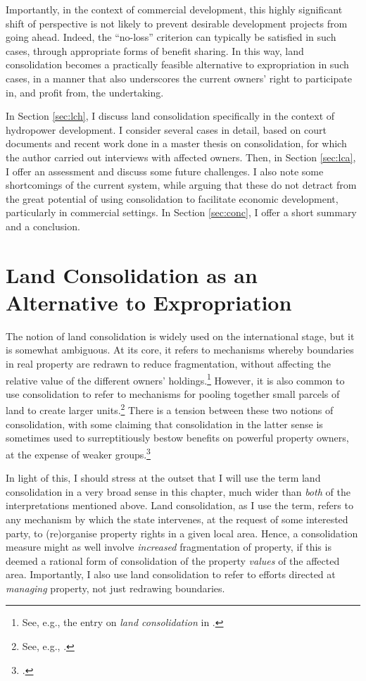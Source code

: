 Importantly, in the context of commercial development, this highly significant shift of perspective is not likely to prevent  desirable development projects from going ahead. Indeed, the ``no-loss'' criterion can typically be satisfied in such cases, through appropriate forms of benefit sharing. In this way, land consolidation becomes a practically feasible alternative to expropriation in such cases, in a manner that also underscores the current owners' right to participate in, and profit from, the undertaking.

In Section \ref{sec:lch}, I discuss land consolidation specifically in the context of hydropower development. I consider several cases in detail, based on court documents and recent work done in a master thesis on consolidation, for which the author carried out interviews with affected owners. Then, in Section \ref{sec:lca}, I offer an assessment and discuss some future challenges. I also note some shortcomings of the current system, while arguing that these do not detract from the great potential of using consolidation to facilitate economic development, particularly in commercial settings. In Section  \ref{sec:conc}, I offer a short summary and a conclusion.

\section{Land Consolidation as an Alternative to Expropriation}\label{sec:lce}

The notion of land consolidation is widely used on the international stage, but it is somewhat ambiguous. At its core, it refers to mechanisms whereby boundaries in real property are redrawn to reduce fragmentation, without affecting the relative value of the different owners' holdings.\footnote{See, e.g., the entry on {\it land consolidation} in \cite{mayhew09}.} However, it is also common to use consolidation to refer to mechanisms for pooling together small parcels of land to create larger units.\footnote{See, e.g., \cite{lerman06}.} There is a tension between these two notions of consolidation, with some claiming that consolidation in the latter sense is sometimes used to surreptitiously bestow benefits on powerful property owners, at the expense of weaker groups.\footcite[237-239]{lipton09}

In light of this, I should stress at the outset that I will use the term land consolidation in a very broad sense in this chapter, much wider than {\it both} of the interpretations mentioned above. Land consolidation, as I use the term, refers to any mechanism by which the state intervenes, at the request of some interested party, to (re)organise property rights in a given local area. Hence, a consolidation measure might as well involve {\it increased} fragmentation of property, if this is deemed a rational form of consolidation of the property {\it values} of the affected area. Importantly, I also use land consolidation to refer to efforts directed at {\it managing} property, not just redrawing boundaries.

